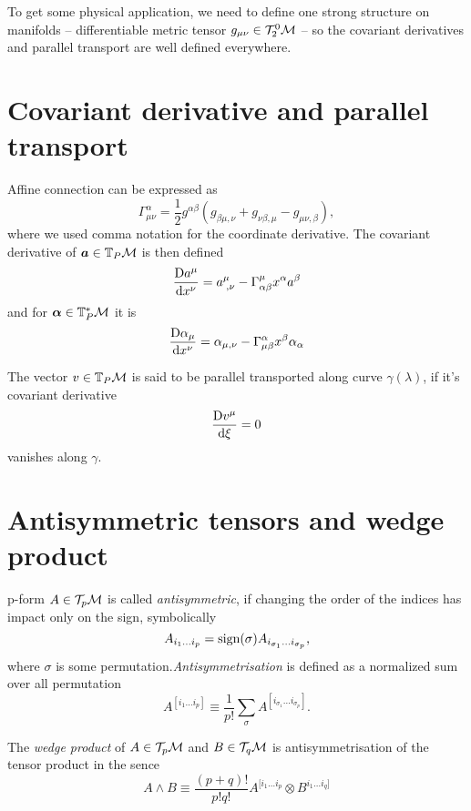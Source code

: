 To get some physical application, we need to define one strong structure on manifolds -- differentiable metric tensor $g_{\mu\nu}\in\mathcal{T}^0_2\mathcal{M}$ -- so the covariant derivatives and parallel transport are well defined everywhere. 

\section{Covariant derivative and parallel transport}
Affine connection can be expressed as
\begin{equation}
    \Gamma^{\alpha}_{\mu\nu} = \frac{1}{2}g^{\alpha \beta}\left(g_{\beta\mu,\nu}+g_{\nu\beta,\mu}-g_{\mu\nu,\beta}\right),
\end{equation}
where we used comma notation for the coordinate derivative.
The covariant derivative of $\bm a\in \mathbb{T}_P\mathcal{M}$ is then defined
\begin{equation}
    \frac{\mathrm{D} a^\mu}{\mathrm{d} x^\nu}=a_{\;,\nu}^\mu-\Gamma^\mu_{\alpha\beta} x^\alpha a^\beta 
\end{equation}
and for $\bm\alpha\in \mathbb{T}_P^*\mathcal{M}$ it is
\begin{equation}
    \frac{\mathrm{D} \alpha_\mu}{\mathrm{d} x^\nu}=\alpha_{\mu,\nu}-\Gamma^\alpha_{\mu\beta}x^\beta \alpha_\alpha 
\end{equation}

The vector $v\in \mathbb{T}_P\mathcal{M}$ is said to be parallel transported along curve $\gamma(\lambda)$, if it's covariant derivative
\begin{equation}
    \frac{\mathrm{D} v^\mu}{\mathrm{d} \xi}=0
\end{equation}
vanishes along $\gamma$.

\section{Antisymmetric tensors and wedge product}
p-form $A\in \mathcal{T}_p \mathcal{M}$ is called \emph{antisymmetric}, if changing the order of the indices has impact only on the sign, symbolically
$$A_{i_1\dots i_p} = \operatorname{\textrm{sign}}(\sigma)A_{i_{\sigma_1}\dots i_{\sigma_p}},$$
where $\sigma$ is some permutation.\emph{Antisymmetrisation} is defined as a normalized sum over all permutation
\begin{equation}
    A^{[i_1\dots i_p]}\equiv \frac{1}{p!}\sum_\sigma A^{[i_{\sigma_1}\dots i_{\sigma_p}]}. 
\end{equation}

The \emph{wedge product} of $A\in \mathcal{T}_p \mathcal{M}$ and $B\in \mathcal{T}_q \mathcal{M}$ is antisymmetrisation of the tensor product in the sence
\begin{equation}
    A\wedge B\equiv \frac{(p+q)!}{p!q!} A^{[i_1\dots i_p}\otimes B^{i_1\dots i_q]}
\end{equation}



